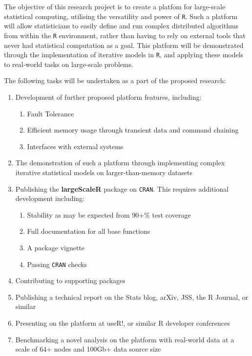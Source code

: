 The objective of this research project is to create a platfom for large-scale statistical computing, utilising the versatility and power of \texttt{R}.
Such a platform will allow statisticians to easily define and run complex distributed algorithms from within the \texttt{R} environment, rather than having to rely on external tools that never had statistical computation as a goal.
This platform will be demonstrated through the implementation of iterative models in \texttt{R}, and applying these models to real-world tasks on large-scale problems.

The following tasks will be undertaken as a part of the proposed research:

\begin{enumerate}
        \item Development of further proposed platform features, including:
                \begin{enumerate}
                        \item Fault Tolerance
                        \item Efficient memory usage through transient data and command chaining
                        \item Interfaces with external systems
                \end{enumerate}
        \item The demonstration of such a platform through implementing complex iterative statistical models on larger-than-memory datasets
	\item Publishing the \textbf{largeScaleR} package on \texttt{CRAN}. This requires additional development including:
                \begin{enumerate}
                        \item Stability as may be expected from 90+\% test coverage
                        \item Full documentation for all base functions
                        \item A package vignette
			\item Passing \texttt{CRAN} checks
                \end{enumerate}
        \item Contributing to supporting packages
        \item Publishing a technical report on the Stats blog, arXiv, JSS, the R Journal, or similar
        \item Presenting on the platform at useR!, or similar R developer conferences
        \item Benchmarking a novel analysis on the platform with real-world data at a scale of 64+ nodes and 100Gb+ data source size
\end{enumerate}
